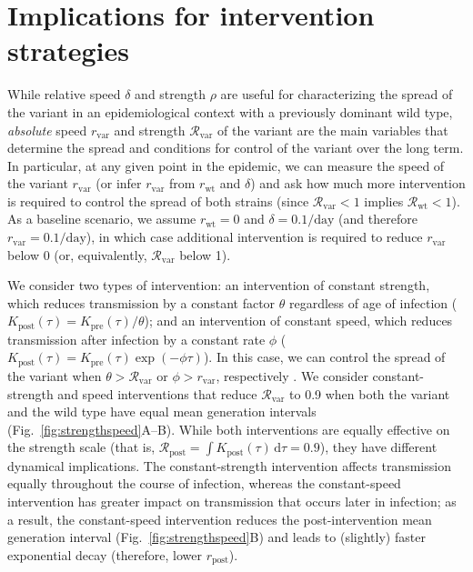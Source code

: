 \documentclass[12pt]{article}
\newcommand{\fref}[1]{Fig.~\ref{fig:#1}}
\newcommand{\vvvar}{\mathrm{var}}
\newcommand{\wwwt}{\mathrm{wt}}
\newcommand{\rx}[1]{\ensuremath{{r}_{#1}}\xspace}
\newcommand{\ry}[1]{\rx{\mathrm{#1}}}
\newcommand{\rw}{\rx{\wwwt}}
\newcommand{\rv}{\rx{\vvvar}}
\newcommand{\Rx}[1]{\ensuremath{{\mathcal R}_{#1}}\xspace}
\newcommand{\Ry}[1]{\Rx{\mathrm{#1}}}
\newcommand{\Rw}{\Rx{\wwwt}}
\newcommand{\Rv}{\Rx{\vvvar}}
\newcommand{\pday}{\ensuremath{/\textrm{day}}}
\newcommand{\dd}[1]{\ensuremath{\, \mathrm{d}#1}}
\newcommand{\dtau}{\dd{\tau}}
\begin{document}
\section{Implications for intervention strategies}

While relative speed $\delta$ and strength $\rho$ are useful for characterizing the spread of the variant in an epidemiological context with a previously dominant wild type, \emph{absolute} speed $\rv$ and strength $\Rv$ of the variant are the main variables that determine the spread and conditions for control of the variant over the long term.
In particular, at any given point in the epidemic, we can measure the speed of the variant $\rv$ (or infer $\rv$ from $\rw$ and $\delta$) and ask how much more intervention is required to control the spread of both strains (since $\Rv < 1$ implies $\Rw < 1$).
As a baseline scenario, we assume $\rw=0$ and $\delta=0.1\pday$ (and therefore $\rv=0.1\pday$), in which case additional intervention is required to reduce $\rv$ below 0 (or, equivalently, $\Rv$ below 1).

We consider two types of intervention:
an intervention of constant strength, which reduces transmission by a constant factor $\theta$ regardless of age of infection ($K_{\mathrm{post}}(\tau) = K_{\mathrm{pre}}(\tau)/\theta$); and an intervention of constant speed, which reduces transmission after infection by a constant rate $\phi$ ($K_{\mathrm{post}}(\tau) = K_{\mathrm{pre}}(\tau) \exp(-\phi \tau)$).
In this case, we can control the spread of the variant when $\theta > \Rv$ or $\phi > \rv$, respectively \citep{doi:10.1098/rspb.2020.1556}.
We consider constant-strength and speed interventions that reduce $\Rv$ to 0.9 when both the variant and the wild type have equal mean generation intervals (\fref{strengthspeed}A--B).
While both interventions are equally effective on the strength scale (that is, $\Ry{post}=\int  K_{\mathrm{post}}(\tau) \dtau = 0.9$), they have different dynamical implications.
The constant-strength intervention affects transmission equally throughout the course of infection, whereas the constant-speed intervention has greater impact on transmission that occurs later in infection;
as a result, the constant-speed intervention reduces the post-intervention mean generation interval (\fref{strengthspeed}B) and leads to (slightly) faster exponential decay (therefore, lower $\ry{post}$).
\end{document}
